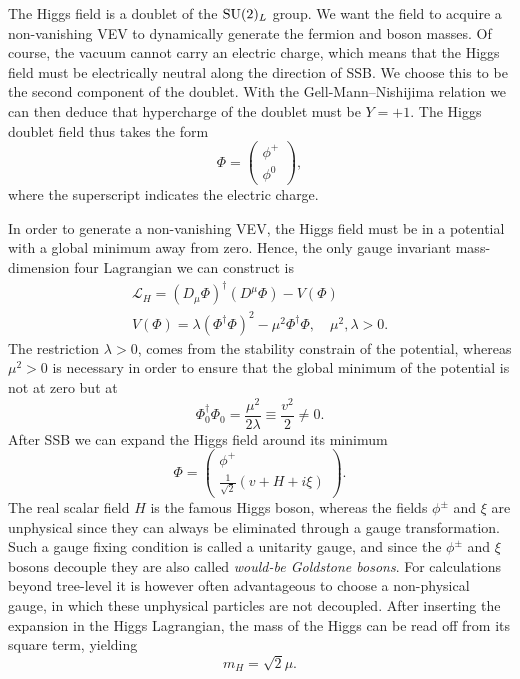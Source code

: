 The Higgs field is a doublet of the $\mathrm{SU}(2)_L$ group. We want the field to acquire a non-vanishing \acs{VEV} to dynamically generate the fermion and boson masses. Of course, the vacuum cannot carry an electric charge, which means that the Higgs field must be electrically neutral along the direction of \acs{SSB}. We choose this to be the second component of the doublet. With the Gell-Mann--Nishijima relation we can then deduce that hypercharge of the doublet must be $Y = +1$. The Higgs doublet field thus takes the form
\begin{equation}
\Phi = \begin{pmatrix}
  \phi^+ \\
  \phi^0
\end{pmatrix},
\end{equation}
where the superscript indicates the electric charge.

In order to generate a non-vanishing \acs{VEV}, the Higgs field must be in a potential with a global minimum away from zero. Hence, the only gauge invariant mass-dimension four Lagrangian we can construct is
\begin{equation}
\begin{gathered}
\mathcal{L}_H = \left( D_\mu \Phi \right)^\dagger \left( D^\mu \Phi \right) - V(\Phi) \\
V(\Phi) = \lambda (\Phi^\dagger \Phi )^2 - \mu^2 \Phi^\dagger \Phi, \quad \mu^2, \lambda > 0.
\end{gathered}
\label{eq:2:Higgs_Lagrangian}
\end{equation}
The restriction $\lambda > 0$, comes from the stability constrain of the potential, whereas $\mu^2 > 0$ is necessary in order to ensure that the global minimum of the potential is not at zero but at
\begin{equation}
\Phi_0^\dagger \Phi_0 = \frac{\mu^2}{2 \lambda} \equiv \frac{v^2}{2} \neq 0.
\end{equation}
After \acs{SSB} we can expand the Higgs field around its minimum
\begin{equation}
\Phi = \begin{pmatrix}
  \phi^+ \\
  \frac{1}{\sqrt{2}} ( v + H + i \xi )
\end{pmatrix}.
\end{equation}
The real scalar field $H$ is the famous Higgs boson, whereas the fields $\phi^\pm$ and $\xi$ are unphysical since they can always be eliminated through a gauge transformation. Such a gauge fixing condition is called a unitarity gauge, and since the $\phi^\pm$ and $\xi$ bosons decouple they are also called \textit{would-be Goldstone bosons}. For calculations beyond tree-level it is however often advantageous to choose a non-physical gauge, in which these unphysical particles are not decoupled. After inserting the expansion in the Higgs Lagrangian, the mass of the Higgs can be read off from its square term, yielding
\begin{equation}
m_H = \sqrt{2} \mu.
\end{equation}

